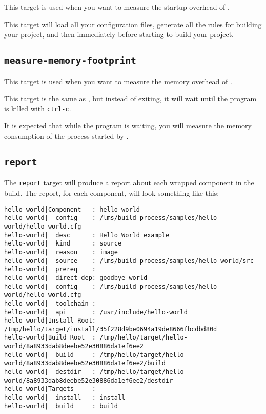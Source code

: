 This target is used when you want to measure the startup overhead of
\lmsbw.

This target will load all your configuration files, generate all the
rules for building your project, and then immediately before starting
to build your project.

\subsection{\texttt{measure-memory-footprint}}

This target is used when you want to measure the memory overhead of
\lmsbw.

This target is the same as , but
instead of exiting, it will wait until the program is killed with
\texttt{ctrl-c}.

It is expected that while the program is waiting, you will measure the
memory consumption of the \make process started by \lmsbw.

\subsection{\texttt{report}}

The \texttt{report} target will produce a report about each wrapped
component in the build.  The report, for each component, will look
something like this:

\begin{landscape}
\begin{small}
\begin{verbatim}
hello-world|Component   : hello-world
hello-world|  config    : /lms/build-process/samples/hello-world/hello-world.cfg
hello-world|  desc      : Hello World example
hello-world|  kind      : source
hello-world|  reason    : image
hello-world|  source    : /lms/build-process/samples/hello-world/src
hello-world|  prereq    :
hello-world|  direct dep: goodbye-world
hello-world|  config    : /lms/build-process/samples/hello-world/hello-world.cfg
hello-world|  toolchain :
hello-world|  api       : /usr/include/hello-world
hello-world|Install Root: /tmp/hello/target/install/35f228d9be0694a19de8666fbcdbd80d
hello-world|Build Root  : /tmp/hello/target/hello-world/8a8933dab8deebe52e30886da1ef6ee2
hello-world|  build     : /tmp/hello/target/hello-world/8a8933dab8deebe52e30886da1ef6ee2/build
hello-world|  destdir   : /tmp/hello/target/hello-world/8a8933dab8deebe52e30886da1ef6ee2/destdir
hello-world|Targets     :
hello-world|  install   : install
hello-world|  build     : build
\end{verbatim}
\end{small}
\end{landscape}

